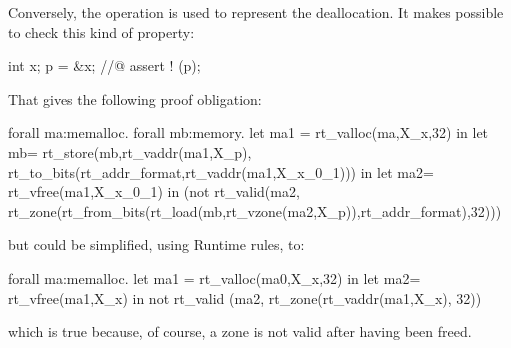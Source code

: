 Conversely, the operation  is used to represent
the deallocation. It makes possible to check this kind of property:
\begin{ccode}
  { int x; p = &x; }
  //@ assert ! \valid (p);
  \end{ccode}
That gives the following proof obligation:
\begin{whycode}
  forall ma:memalloc.
  forall mb:memory.
  let ma1 = rt_valloc(ma,X_x,32) in
  let mb= rt_store(mb,rt_vaddr(ma1,X_p),
             rt_to_bits(rt_addr_format,rt_vaddr(ma1,X_x_0_1))) in
  let ma2= rt_vfree(ma1,X_x_0_1) in
  (not rt_valid(ma2,
      rt_zone(rt_from_bits(rt_load(mb,rt_vzone(ma2,X_p)),rt_addr_format),32)))
\end{whycode}
but could be simplified, using Runtime rules, to:
\begin{whycode}
  forall ma:memalloc.
  let ma1 = rt_valloc(ma0,X_x,32) in
  let ma2= rt_vfree(ma1,X_x) in
  not rt_valid (ma2, rt_zone(rt_vaddr(ma1,X_x), 32))
\end{whycode}
which is true because, of course, a zone is not valid after having been freed.
